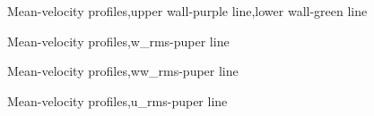 \begin{figure}[H]
\centering
 \caption{Mean-velocity profiles,upper wall-purple line,lower wall-green line}
\label{pd}
\end{figure}

\begin{figure}[H]
\centering
 \caption{Mean-velocity profiles,w_{rms}-puper line}
\label{pd}
\end{figure}

\begin{figure}[H]
\centering
 \caption{Mean-velocity profiles,ww_{rms}-puper line}
\label{pd}
\end{figure}

\begin{figure}[H]
\centering
 \caption{Mean-velocity profiles,u_{rms}-puper line}
\label{pd}
\end{figure}

